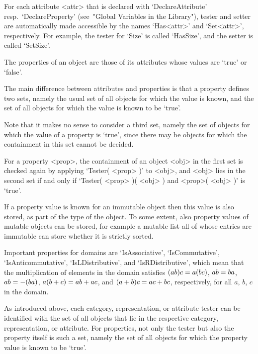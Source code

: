 For each attribute <attr> that is declared with `DeclareAttribute'
resp.~`DeclareProperty' (see~"Global Variables in the Library"),
tester and setter are automatically made accessible by the names
`Has<attr>' and `Set<attr>', respectively.
For example, the tester for `Size' is called `HasSize',
and the setter is called `SetSize'.



The properties of an object are those of its attributes whose values are
`true' or `false'.

The main difference between attributes and properties is that a property
defines two sets,
namely the usual set of all objects for which the value is known,
and the set of all objects for which the value is known to be `true'.

Note that it makes no sense to consider a third set, namely the set of
objects for which the value of a property is `true', since there may be
objects for which the containment in this set cannot be decided.

For a property <prop>, the containment of an object <obj> in the first
set is checked again by applying `Tester( <prop> )' to <obj>,
and <obj> lies in the second set if and only if
`Tester( <prop> )( <obj> ) and <prop>( <obj> )' is `true'.

If a property value is known for an immutable object then this value is
also stored, as part of the type of the object.
To some extent, also property values of mutable objects can be stored,
for example a mutable list all of whose entries are immutable can store
whether it is strictly sorted.

Important properties for domains are `IsAssociative', `IsCommutative',
`IsAnticommutative', `IsLDistributive', and `IsRDistributive',
which mean that the multiplication of elements in the domain satisfies
$(a \* b ) \* c = a \* ( b \* c )$, $a \* b = b \* a$,
$a \* b = - ( b \* a )$, $a \* ( b + c ) = a \* b + a \* c$,
and $( a + b ) \* c = a \* c + b \* c$, respectively,
for all $a$, $b$, $c$ in the domain.


As introduced above, each category, representation, or attribute tester
can be identified with the set of all objects that lie in the respective
category, representation, or attribute.
For properties, not only the tester but also the property itself is such
a set,
namely the set of all objects for which the property value is known to be
`true'.


